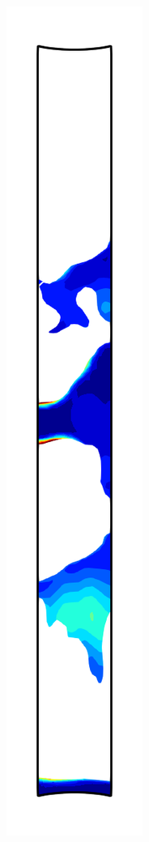 \begin{figure}[!htb]
\begin{subfigure}{0.08\textwidth}
  \end{subfigure}
  \begin{subfigure}{0.08\textwidth}
    \centering
    \includegraphics[width=\textwidth]{Chapter5/figures/spallation/psii_6}

\end{subfigure}
\end{figure}

